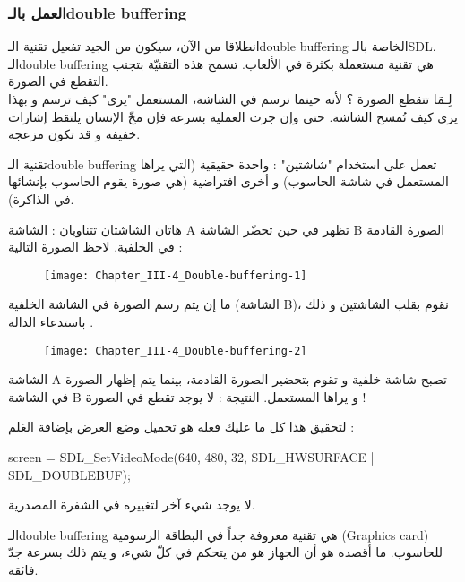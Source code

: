 \subsubsection{العمل بالـ\textenglish{double buffering}}

انطلاقا من الآن، سيكون من الجيد تفعيل تقنية الـ\textenglish{double buffering}
الخاصة بالـ\textenglish{SDL}.
الـ\textenglish{double buffering}
هي تقنية مستعملة بكثرة في الألعاب. تسمح هذه التقنيّة بتجنب التقطع في الصورة.\\
لِـمَا تتقطع الصورة ؟ لأنه حينما نرسم في الشاشة، المستعمل "يرى" كيف ترسم و بهذا يرى كيف تُمسح الشاشة. حتى وإن جرت العملية بسرعة فإن مخّ الإنسان يلتقط إشارات خفيفة و قد تكون مزعجة.

تقنية الـ\textenglish{double buffering}
تعمل على استخدام "شاشتين" : واحدة حقيقية (التي يراها المستعمل في شاشة الحاسوب) و أخرى افتراضية (هي صورة يقوم الحاسوب بإنشائها في الذاكرة).

هاتان الشاشتان تتناوبان : الشاشة
\textenglish{A}
تظهر في حين تحضّر الشاشة
\textenglish{B}
الصورة القادمة في  الخلفية. لاحظ الصورة التالية :

\begin{figure}[H]
	\centering
	\texttt{[image: Chapter\_III-4\_Double-buffering-1]}
\end{figure}

ما إن يتم رسم الصورة في الشاشة الخلفية (الشاشة 
\textenglish{B})،
نقوم بقلب الشاشتين و ذلك باستدعاء الدالة
.

\begin{figure}[H]
	\centering
	\texttt{[image: Chapter\_III-4\_Double-buffering-2]}
\end{figure}

الشاشة
\textenglish{A}
تصبح شاشة خلفية و تقوم بتحضير الصورة القادمة، بينما يتم إظهار الصورة في الشاشة
\textenglish{B}
و يراها المستعمل. النتيجة : لا يوجد تقطع في الصورة !

لتحقيق هذا كل ما عليك فعله هو تحميل وضع العرض بإضافة العَلم 
 :

\begin{Csource}
screen = SDL_SetVideoMode(640, 480, 32, SDL_HWSURFACE | SDL_DOUBLEBUF);
\end{Csource}

لا يوجد شيء آخر لتغييره في الشفرة المصدرية.

\begin{information}
 الـ\textenglish{double buffering}
هي تقنية معروفة جداً في البطاقة الرسومية
(\textenglish{Graphics card})
 للحاسوب. ما أقصده هو أن الجهاز هو من يتحكم في كلّ شيء، و يتم ذلك بسرعة جدّ فائقة.
\end{information}

